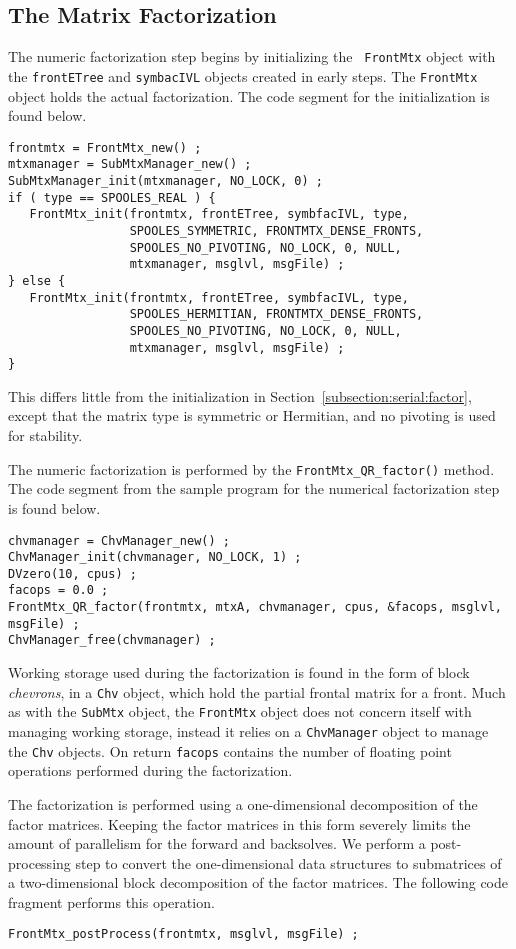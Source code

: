 \subsection{The Matrix Factorization}
\label{subsection:QR:factor}
\par
The numeric factorization step begins by initializing the {\tt
FrontMtx} object with the {\tt frontETree} and {\tt symbacIVL} 
objects created in early steps.
The {\tt FrontMtx} object holds the actual factorization.
The code segment for the initialization is found below.
\begin{verbatim}
frontmtx = FrontMtx_new() ;
mtxmanager = SubMtxManager_new() ;
SubMtxManager_init(mtxmanager, NO_LOCK, 0) ;
if ( type == SPOOLES_REAL ) {
   FrontMtx_init(frontmtx, frontETree, symbfacIVL, type, 
                 SPOOLES_SYMMETRIC, FRONTMTX_DENSE_FRONTS, 
                 SPOOLES_NO_PIVOTING, NO_LOCK, 0, NULL,
                 mtxmanager, msglvl, msgFile) ;
} else {
   FrontMtx_init(frontmtx, frontETree, symbfacIVL, type, 
                 SPOOLES_HERMITIAN, FRONTMTX_DENSE_FRONTS, 
                 SPOOLES_NO_PIVOTING, NO_LOCK, 0, NULL,
                 mtxmanager, msglvl, msgFile) ;
}
\end{verbatim}
This differs little from the initialization in
Section~\ref{subsection:serial:factor}, except that the matrix type
is symmetric or Hermitian, and no pivoting is used for stability.
\par
The numeric factorization is performed by the 
{\tt FrontMtx\_QR\_factor()} method.  
The code segment from the sample program for the numerical
factorization step is found below.
\begin{verbatim}
chvmanager = ChvManager_new() ;
ChvManager_init(chvmanager, NO_LOCK, 1) ;
DVzero(10, cpus) ;
facops = 0.0 ;
FrontMtx_QR_factor(frontmtx, mtxA, chvmanager, cpus, &facops, msglvl, msgFile) ;
ChvManager_free(chvmanager) ;
\end{verbatim}
Working storage used during the factorization is found in the form
of block {\it chevrons}, in a {\tt Chv} object, which hold the partial 
frontal matrix for a front.
Much as with the {\tt SubMtx} object, the {\tt FrontMtx} object does
not concern itself with managing working storage, instead it relies
on a {\tt ChvManager} object to manage the {\tt Chv} objects.
On return {\tt facops} contains the number of floating point
operations performed during the factorization.
\par
The factorization is performed using a one-dimensional
decomposition of the factor matrices.
Keeping the factor matrices in this form severely limits the amount
of parallelism for the forward and backsolves.
We perform a post-processing step to convert the one-dimensional
data structures to submatrices of a two-dimensional block
decomposition of the factor matrices.
The following code fragment performs this operation.
\begin{verbatim}
FrontMtx_postProcess(frontmtx, msglvl, msgFile) ;
\end{verbatim}
\par
